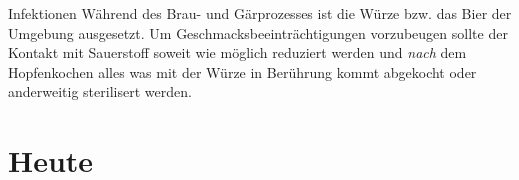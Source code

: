 \documentclass[9pt, ngerman]{beamer}
\begin{document}
\begin{frame}{Infektionen}
  Während des Brau- und Gärprozesses ist die Würze bzw. das Bier der Umgebung
  ausgesetzt. Um Geschmacksbeeinträchtigungen vorzubeugen sollte der Kontakt
  mit Sauerstoff soweit wie möglich reduziert werden und \emph{nach} dem
  Hopfenkochen alles was mit der Würze in Berührung kommt abgekocht oder
  anderweitig sterilisert werden.
\end{frame}

\section{Heute}
\end{document}
